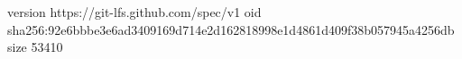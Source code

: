 version https://git-lfs.github.com/spec/v1
oid sha256:92e6bbbe3e6ad3409169d714e2d162818998e1d4861d409f38b057945a4256db
size 53410
